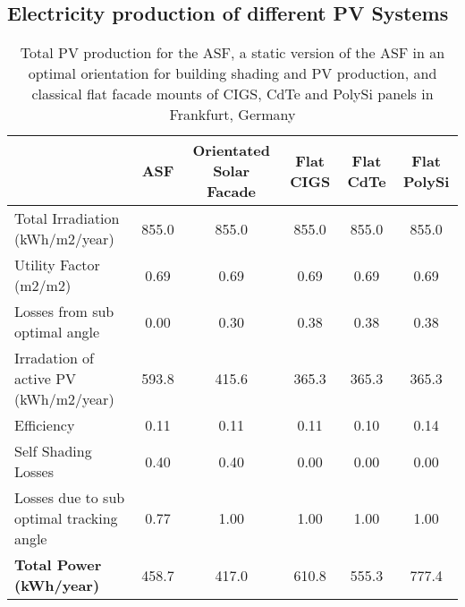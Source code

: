 

\subsection{Electricity production of different PV Systems}
\begin{landscape}
\begin{table}
\begin{tabular}{lccccc}
\hline
                                         &  ASF & Orientated Solar Facade & Flat  CIGS & Flat  CdTe & Flat  PolySi \\
\hline
Total Irradiation (kWh/m2/year)          & 855.0 & 855.0 & 855.0 & 855.0 & 855.0 \\
Utility Factor (m2/m2)                   & 0.69  & 0.69  & 0.69  & 0.69  & 0.69  \\
Losses from sub optimal angle            & 0.00  & 0.30  & 0.38  & 0.38  & 0.38  \\
Irradation of active PV  (kWh/m2/year)   & 593.8 & 415.6 & 365.3 & 365.3 & 365.3 \\
Efficiency                               & 0.11  & 0.11  & 0.11  & 0.10  & 0.14  \\
Self Shading Losses                      & 0.40  & 0.40  & 0.00  & 0.00  & 0.00  \\
Losses due to sub optimal tracking angle & 0.77  & 1.00  & 1.00  & 1.00  & 1.00  \\
\textbf{Total Power (kWh/year)}          & 458.7 & 417.0 & 610.8 & 555.3 & 777.4 \\
\hline
\end{tabular}
\caption{Total PV production for the ASF, a static version of the ASF in an optimal orientation for building shading and PV production, and classical flat facade mounts of CIGS, CdTe and PolySi panels in Frankfurt, Germany}
\label{tab:PVCalc}
\end{table}

\end{landscape}

